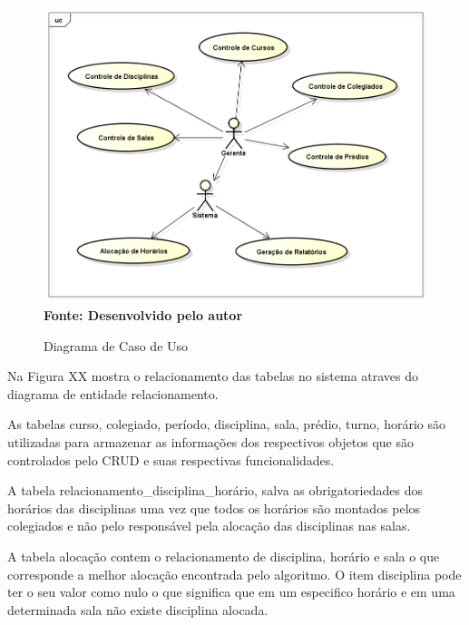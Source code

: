 \documentclass{abntpuc}
\begin{document}
\begin{figure}[!htb]
\caption[Diagrama de Caso de Uso]{Diagrama de Caso de Uso}
\label{fig:figura1}
\centering
\includegraphics[scale=0.4]{imagens/diagramaCasoUso.png}
\\ \textbf{\footnotesize Fonte: Desenvolvido pelo autor}
\end{figure}


Na Figura XX mostra o relacionamento das tabelas no sistema atraves do diagrama de entidade relacionamento.\par

As tabelas curso, colegiado, período, disciplina, sala, prédio, turno, horário são utilizadas para armazenar as informações dos respectivos objetos que são controlados pelo CRUD e suas respectivas funcionalidades.\par

A tabela relacionamento\_disciplina\_horário, salva as obrigatoriedades dos horários das disciplinas uma vez que todos os horários são montados pelos colegiados e não pelo responsável pela alocação das disciplinas nas salas.\par

A tabela alocação contem o relacionamento de disciplina, horário e sala o que corresponde a melhor alocação encontrada pelo algoritmo. O item disciplina pode ter o seu valor como nulo o que significa que em um especifico horário e em uma determinada sala não existe disciplina alocada.\par
\end{document}
